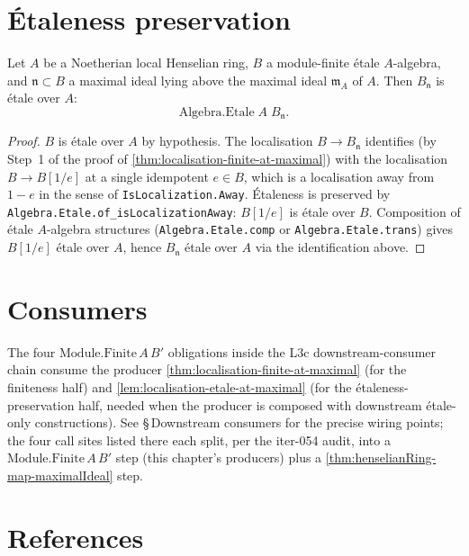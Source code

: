 \section{Étaleness preservation}

\begin{lemma}
\label{lem:localisation-etale-at-maximal}
Let $A$ be a Noetherian local Henselian ring, $B$ a module-finite
étale $A$-algebra, and $\mathfrak n \subset B$ a maximal ideal
lying above the maximal ideal $\mathfrak m_A$ of $A$. Then
$B_{\mathfrak n}$ is étale over $A$:
\[
  \mathrm{Algebra.Etale}\;A\;B_{\mathfrak n}.
\]
\end{lemma}

\begin{proof}
\leanok
$B$ is étale over $A$ by hypothesis. The localisation
$B \to B_{\mathfrak n}$ identifies (by Step~1 of the proof of
\cref{thm:localisation-finite-at-maximal}) with the localisation
$B \to B[1/e]$ at a single idempotent $e \in B$, which is a
localisation away from $1-e$ in the sense of
\texttt{IsLocalization.Away}. Étaleness is preserved by
\texttt{Algebra.Etale.of\_isLocalizationAway}: $B[1/e]$ is étale
over $B$. Composition of étale $A$-algebra structures
(\texttt{Algebra.Etale.comp} or \texttt{Algebra.Etale.trans})
gives $B[1/e]$ étale over $A$, hence $B_{\mathfrak n}$ étale
over $A$ via the identification above.
\end{proof}

\section{Consumers}

The four $\mathrm{Module.Finite}\,A\,B'$ obligations inside the
L3c downstream-consumer chain consume the producer
\cref{thm:localisation-finite-at-maximal} (for the finiteness
half) and \cref{lem:localisation-etale-at-maximal} (for the
étaleness-preservation half, needed when the producer is
composed with downstream étale-only constructions). See
 \S\,Downstream
consumers for the precise wiring points; the four call sites
listed there each split, per the iter-054 audit, into a
$\mathrm{Module.Finite}\,A\,B'$ step (this chapter's producers)
plus a \cref{thm:henselianRing-map-maximalIdeal} step.

\section{References}


